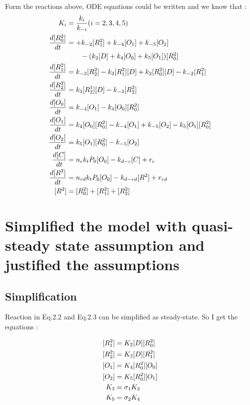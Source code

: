 Form the reactions above, ODE equations could be written and we know that : 
\begin{equation} 
\begin{aligned} 
\centering
K_i &= \frac{k_i}{k_{-i}}(i = 2,3,4,5) \\
\frac{d[R_0^2]}{dt} &=  + k_{-2} [R^2_1] + k_{-4}[O_1] + k_{-5}[O_2] \\
				    &\qquad - (k_2[D]+k_4[O_0]+k_5[O_1]) [R_0^2] \\
\frac{d[R_1^2]}{dt} &= k_{-3}[R_2^2]-k_3[R^2_1][D]+k_2[R^2_0][D]-k_{-2}[R^2_1] \\
\frac{d[R_2^2]}{dt} &= k_{3}[R_2^1][D]- k_{-3}[R^2_2] \\
\frac{d[O_0]}{dt} &= k_{-4}[O_1]-k_4[O_0][R_0^2] \\
\frac{d[O_1]}{dt} &= k_4[O_0][R_0^2]-k_{-4}[O_1]+k_{-5}[O_2]-k_5[O_1][R_0^2] \\
\frac{d[O_2]}{dt} &= k_5[O_1][R_0^2]-k_{-5}[O_2] \\
\frac{d[C]}{dt} &= n_c k_t P_0 [O_0] - k_{d-c}[C] + r_c \\
\frac{d[R^2]}{dt} &= n_{rd} k_t P_0 [O_0] - k_{d-rd}[R^2] + r_{rd} \\
[R^2] &= [R_0^2] + [R_1^2] + [R_2^2]
\end{aligned} 
\end{equation}

\newpage
\section{Simplified the model with quasi-steady state assumption and justified the assumptions}

\subsection{Simplification}
Reaction in Eq.2.2 and Eq.2.3 can be simplified as steady-state.
So I get the equations :

\begin{equation} 
\begin{aligned} 
\centering
[R^2_1] &= K_2[D][R^2_0] \\
[R^2_2] &= K_3[D][R^2_1] \\
[O_1]   &= K_4[R^2_0][O_0] \\
[O_2]   &= K_5[R^2_0][O_1] \\
K_{3} &= \sigma_{1} K_{2} \\
K_{5} &= \sigma_{2} K_{4} \\
\end{aligned} 
\end{equation}

